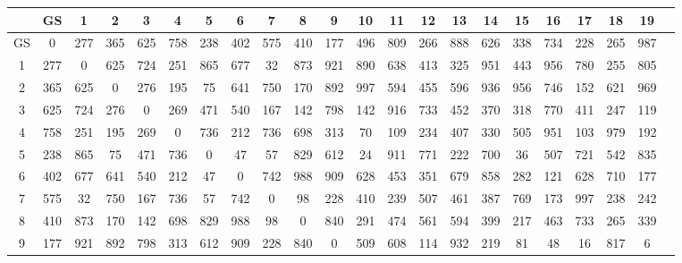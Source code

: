 \documentclass[a4paper, 12pt]{book}
\begin{document}
\begin{table}[h]
\tiny
  \begin{center}
    \begin{tabulary}{1.0\textwidth}{
       | C | C | C | C | C | C | C | C | C | C | C | C | C | C | C | C | C | C | C | C | C | C |
    }
    & GS & 1 & 2 & 3 & 4 & 5 & 6 & 7 & 8 & 9 & 10 & 11 & 12 & 13 & 14 & 15 & 16 & 17 & 18 & 19 \\ \hline

GS & 0 & 277 & 365 & 625 & 758 & 238 & 402 & 575 & 410 & 177 & 496 & 809 & 266 & 888 & 626 & 338 & 734 & 228 & 265 & 987 \\ \hline

1 & 277 & 0 & 625 & 724 & 251 & 865 & 677 & 32 & 873 & 921 & 890 & 638 & 413 & 325 & 951 & 443 & 956 & 780 & 255 & 805 \\ \hline

2 & 365 & 625 & 0 & 276 & 195 & 75 & 641 & 750 & 170 & 892 & 997 & 594 & 455 & 596 & 936 & 956 & 746 & 152 & 621 & 969 \\ \hline

3 & 625 & 724 & 276 & 0 & 269 & 471 & 540 & 167 & 142 & 798 & 142 & 916 & 733 & 452 & 370 & 318 & 770 & 411 & 247 & 119 \\ \hline

4 & 758 & 251 & 195 & 269 & 0 & 736 & 212 & 736 & 698 & 313 & 70 & 109 & 234 & 407 & 330 & 505 & 951 & 103 & 979 & 192 \\ \hline

5 & 238 & 865 & 75 & 471 & 736 & 0 & 47 & 57 & 829 & 612 & 24 & 911 & 771 & 222 & 700 & 36 & 507 & 721 & 542 & 835 \\ \hline

6 & 402 & 677 & 641 & 540 & 212 & 47 & 0 & 742 & 988 & 909 & 628 & 453 & 351 & 679 & 858 & 282 & 121 & 628 & 710 & 177 \\ \hline

7 & 575 & 32 & 750 & 167 & 736 & 57 & 742 & 0 & 98 & 228 & 410 & 239 & 507 & 461 & 387 & 769 & 173 & 997 & 238 & 242 \\ \hline

8 & 410 & 873 & 170 & 142 & 698 & 829 & 988 & 98 & 0 & 840 & 291 & 474 & 561 & 594 & 399 & 217 & 463 & 733 & 265 & 339 \\ \hline

9 & 177 & 921 & 892 & 798 & 313 & 612 & 909 & 228 & 840 & 0 & 509 & 608 & 114 & 932 & 219 & 81 & 48 & 16 & 817 & 6 \\ \hline


\end{tabulary}
\end{center}
\end{table}
\end{document}
